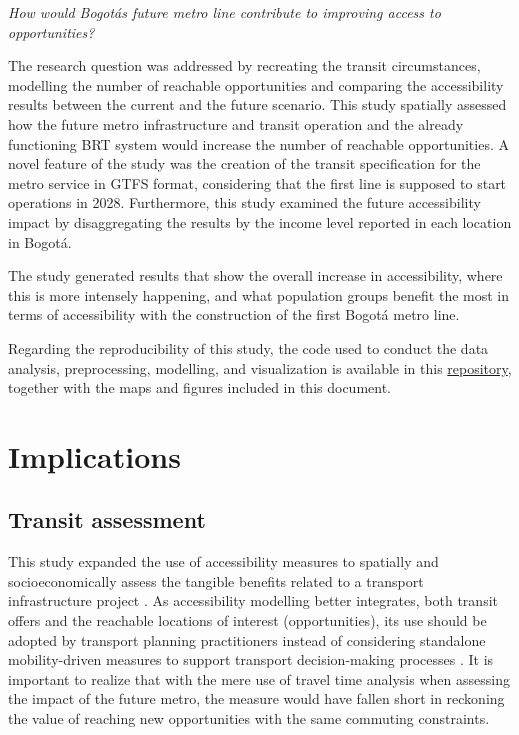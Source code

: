 \documentclass[12pt, a4paper]{report}
\begin{document}
\begin{center}
    \textit{How would Bogot\'{a}\textquotesingle s future metro line contribute to improving access to opportunities?} 
\end{center}

The research question was addressed by recreating the transit circumstances, modelling the number of reachable opportunities and comparing the accessibility results between the current and the future scenario. This study spatially assessed how the future metro infrastructure and transit operation and the already functioning BRT system would increase the number of reachable opportunities. A novel feature of the study was the creation of the transit specification for the metro service in GTFS format, considering that the first line is supposed to start operations in 2028. Furthermore, this study examined the future accessibility impact by disaggregating the results by the income level reported in each location in Bogotá.

The study generated results that show the overall increase in accessibility, where this is more intensely happening, and what population groups benefit the most in terms of accessibility with the construction of the first Bogotá metro line.


Regarding the reproducibility of this study, the code used to conduct the data analysis, preprocessing, modelling, and visualization is available in this \href{https://github.com/rpoandres/MSc_USS_Dissertation}{repository}, together with the maps and figures included in this document.

\section{Implications}

\subsection{Transit assessment}

This study expanded the use of accessibility measures to spatially and socioeconomically assess the tangible benefits related to a transport infrastructure project \citep{bocarejos.TransportAccessibilitySocial2012,bocarejoAccessibilityAnalysisIntegrated2014,guzmanAssessingEquityTransport2017}. As accessibility modelling better integrates, both transit offers and the reachable locations of interest (opportunities), its use should be adopted by transport planning practitioners instead of considering standalone mobility-driven measures to support transport decision-making processes \citep{ferreiraAccessibilityGoldMobility2012}. It is important to realize that with the mere use of travel time analysis when assessing the impact of the future metro, the measure would have fallen short in reckoning the value of reaching new opportunities with the same commuting constraints.
\end{document}
